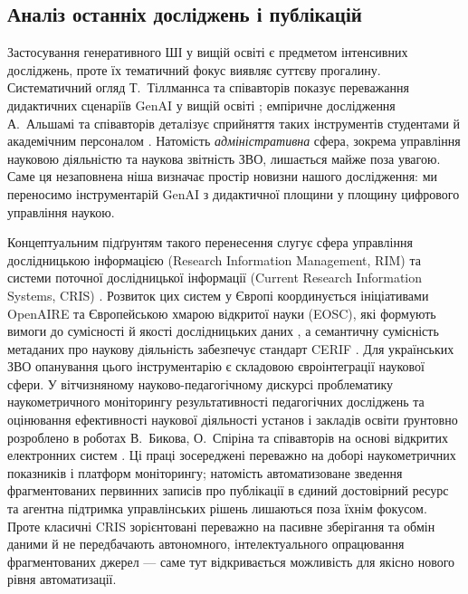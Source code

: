\subsection*{Аналіз останніх досліджень і публікацій}

Застосування генеративного ШІ у вищій освіті є предметом інтенсивних досліджень, проте їх тематичний фокус виявляє суттєву прогалину. Систематичний огляд Т.~Тіллманнса та співавторів показує переважання дидактичних сценаріїв GenAI у вищій освіті \cite{Tillmanns2025SystematicReviewGenAIHE}; емпіричне дослідження А.~Альшамі та співавторів деталізує сприйняття таких інструментів студентами й академічним персоналом \cite{Alshamy2025PerceptionsGenAIHE}. Натомість \textit{адміністративна} сфера, зокрема управління науковою діяльністю та наукова звітність ЗВО, лишається майже поза увагою. Саме ця незаповнена ніша визначає простір новизни нашого дослідження: ми переносимо інструментарій GenAI з дидактичної площини у площину цифрового управління наукою.

Концептуальним підґрунтям такого перенесення слугує сфера управління дослідницькою інформацією (Research Information Management, RIM) та системи поточної дослідницької інформації (Current Research Information Systems, CRIS) \cite{Bryant2017RIMDefining}. Розвиток цих систем у Європі координується ініціативами OpenAIRE та Європейською хмарою відкритої науки (EOSC), які формують вимоги до сумісності й якості дослідницьких даних \cite{OpenAIRE2023GuidelinesCRIS}, а семантичну сумісність метаданих про наукову діяльність забезпечує стандарт CERIF \cite{euroCRIS2024CERIF}. Для українських ЗВО опанування цього інструментарію є складовою євроінтеграції наукової сфери. У вітчизняному науково-педагогічному дискурсі проблематику наукометричного моніторингу результативності педагогічних досліджень та оцінювання ефективності наукової діяльності установ і закладів освіти ґрунтовно розроблено в роботах В.~Бикова, О.~Спіріна та співавторів на основі відкритих електронних систем \cite{Bykov2021ScientometricIndicators, Bykov2020OpenDigitalSystems}. Ці праці зосереджені переважно на доборі наукометричних показників і платформ моніторингу; натомість автоматизоване зведення фрагментованих первинних записів про публікації в єдиний достовірний ресурс та агентна підтримка управлінських рішень лишаються поза їхнім фокусом. Проте класичні CRIS зорієнтовані переважно на пасивне зберігання та обмін даними й не передбачають автономного, інтелектуального опрацювання фрагментованих джерел --- саме тут відкривається можливість для якісно нового рівня автоматизації.

